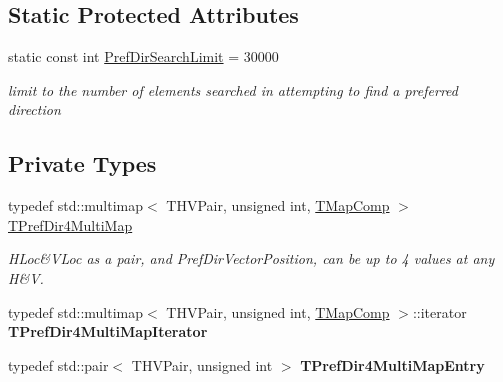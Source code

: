 \subsection*{Static Protected Attributes}
\begin{DoxyCompactItemize}
\item 
\mbox{\label{class_t_one_pref_dir_a9fc8032fb9c525951620e7aafa067d45}} 
static const int \mbox{\hyperlink{class_t_one_pref_dir_a9fc8032fb9c525951620e7aafa067d45}{Pref\+Dir\+Search\+Limit}} = 30000
\begin{DoxyCompactList}\small\item\em limit to the number of elements searched in attempting to find a preferred direction \end{DoxyCompactList}\end{DoxyCompactItemize}
\subsection*{Private Types}
\begin{DoxyCompactItemize}
\item 
\mbox{\label{class_t_one_pref_dir_a940ba2bdbedb288c8188c1da5c4c79bc}} 
typedef std\+::multimap$<$ T\+H\+V\+Pair, unsigned int, \mbox{\hyperlink{class_t_map_comp}{T\+Map\+Comp}} $>$ \mbox{\hyperlink{class_t_one_pref_dir_a940ba2bdbedb288c8188c1da5c4c79bc}{T\+Pref\+Dir4\+Multi\+Map}}
\begin{DoxyCompactList}\small\item\em H\+Loc\&V\+Loc as a pair, and Pref\+Dir\+Vector\+Position, can be up to 4 values at any H\&V. \end{DoxyCompactList}\item 
\mbox{\label{class_t_one_pref_dir_a37efac41fc00465b0569704517233d4e}} 
typedef std\+::multimap$<$ T\+H\+V\+Pair, unsigned int, \mbox{\hyperlink{class_t_map_comp}{T\+Map\+Comp}} $>$\+::iterator {\bfseries T\+Pref\+Dir4\+Multi\+Map\+Iterator}
\item 
\mbox{\label{class_t_one_pref_dir_a05da09493d511df74b8e5b9a794c2e0b}} 
typedef std\+::pair$<$ T\+H\+V\+Pair, unsigned int $>$ {\bfseries T\+Pref\+Dir4\+Multi\+Map\+Entry}
\end{DoxyCompactItemize}
